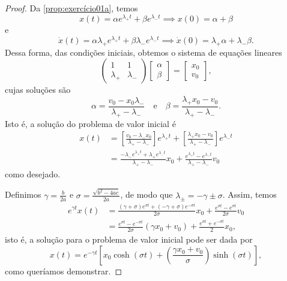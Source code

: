 \begin{proof}
    Da \cref{prop:exercício01a}, temos
    \begin{equation*}
        x(t) = \alpha e^{\lambda_+ t} + \beta e^{\lambda_- t} \implies x(0) = \alpha + \beta
    \end{equation*}
    e
    \begin{equation*}
        \dot{x}(t) = \alpha \lambda_+ e^{\lambda_+ t} + \beta \lambda_- e^{\lambda_- t} \implies \dot{x}(0) = \lambda_+\alpha + \lambda_-\beta.
    \end{equation*}
    Dessa forma, das condições iniciais, obtemos o sistema de equações lineares
    \begin{equation*}
       \begin{pmatrix}
           1 & 1\\\lambda_+&\lambda_-
       \end{pmatrix}
       \begin{bmatrix}
           \alpha \\ \beta
       \end{bmatrix}
       =
       \begin{bmatrix}
           x_0\\
           v_0
       \end{bmatrix},
    \end{equation*}
    cujas soluções são
    \begin{equation*}
        \alpha = \frac{v_0 - x_0 \lambda_-}{\lambda_+ - \lambda_-}\quad\text{e}\quad \beta = \frac{\lambda_+ x_0 - v_0}{\lambda_+ - \lambda_-}.
    \end{equation*}
    Isto é, a solução do problema de valor inicial é
    \begin{align*}
        x(t) &= \left[\frac{v_0 - \lambda_- x_0}{\lambda_+ - \lambda_-}\right]e^{\lambda_+ t} + \left[\frac{\lambda_+ x_0 - v_0}{\lambda_+ - \lambda_-}\right]e^{\lambda_- t}\\
             &= \frac{-\lambda_- e^{\lambda_+ t} + \lambda_+ e^{\lambda_- t}}{\lambda_+ - \lambda_-}x_0 + \frac{e^{\lambda_+ t} - e^{\lambda_-t}}{\lambda_+ - \lambda_-}v_0
    \end{align*}
    como desejado.

    Definimos \(\gamma = \frac{b}{2a}\) e \(\sigma = \frac{\sqrt{b^2 - 4ac}}{2a}\), de modo que \(\lambda_\pm = - \gamma \pm \sigma\). Assim, temos
    \begin{align*}
        e^{\gamma t}x(t) &= \frac{(\gamma + \sigma)e^{\sigma t} + (-\gamma + \sigma)e^{-\sigma t}}{2\sigma}x_0 + \frac{e^{\sigma t} - e^{\sigma t}}{2\sigma}v_0\\
                         &= \frac{e^{\sigma t} - e^{-\sigma t}}{2\sigma} \left(\gamma x_0 + v_0\right) + \frac{e^{\sigma t} + e^{-\sigma t}}{2} x_0,
    \end{align*}
    isto é, a solução para o problema de valor inicial pode ser dada por
    \begin{equation*}
        x(t) = e^{-\gamma t} \left[x_0\cosh(\sigma t) + \left(\frac{\gamma x_0 + v_0}{\sigma}\right)\sinh(\sigma t)\right],
    \end{equation*}
    como queríamos demonstrar.
\end{proof}

